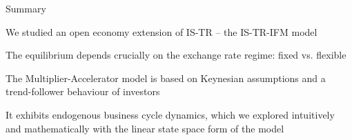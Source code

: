 \documentclass{beamer}
\newenvironment{mytemize}
{\vfill\itemize[nolistsep,itemsep=\fill,label=\color{blue}{$\triangleright$}]}
  {\enditemize}
\begin{document}
\begin{frame}{Summary}

\begin{mytemize}
    \item We studied an open economy extension of IS-TR -- the IS-TR-IFM model
    \item The equilibrium depends crucially on the exchange rate regime: fixed vs. flexible
    \item The Multiplier-Accelerator model is based on Keynesian assumptions and a trend-follower behaviour of investors
    \item It exhibits endogenous business cycle dynamics, which we explored intuitively and mathematically with the linear state space form of the model
\end{mytemize}
\end{frame}
\end{document}
